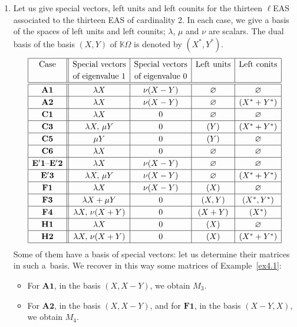 \documentclass[10pt,a4paper]{amsart}
\numberwithin{equation}{section}
\begin{document}
\begin{Example}\quad
\begin{enumerate}\itemsep=0pt
\item[(1)] Let us give special vectors, left units and left counits for the thirteen $\ell$EAS associated to the thirteen EAS of cardinality 2. In each case, we give a basis of the spaces of left units and left counits; $\lambda$, $\mu$ and $\nu$ are scalars.
The dual basis of the basis $(X,Y)$ of $\mathbb{K}\Omega$ is denoted by $(X^*,Y^*)$.
$$\renewcommand{\arraystretch}{1.2} \begin{array}{|c||c|c|c|c|}
\hline \text{Case}&\text{Special vectors}&\text{Special vectors}&\text{Left units}&\text{Left conits}\\
&\text{of eigenvalue 1}&\text{of eigenvalue 0}&&\\
\hline \hline \mathbf{A1}&\lambda X&\nu(X-Y)&\varnothing&\varnothing\\
\hline \mathbf{A2}&\lambda X&\nu(X-Y)&\varnothing&(X^*+Y^*)\\
\hline \mathbf{C1}&\lambda X&0&\varnothing&\varnothing\\
\hline \mathbf{C3}&\lambda X,\, \mu Y&0&(Y)&(X^*+Y^*)\\
\hline \mathbf{C5}&\mu Y&0&(Y)&\varnothing\\
\hline \mathbf{C6}&\lambda X&0&\varnothing&\varnothing\\
\hline \mathbf{E'1}\text{--}\mathbf{E'2}&\lambda X&\nu(X-Y)&\varnothing&\varnothing\\
\hline \mathbf{E'3}&\lambda X,\, \mu Y&\nu(X-Y)&\varnothing&(X^*+Y^*)\\
\hline \mathbf{F1}&\lambda X&\nu(X-Y)&(X)&\varnothing\\
\hline \mathbf{F3}&\lambda X+\mu Y&0&(X,Y)&(X^*,Y^*)\\
\hline \mathbf{F4}&\lambda X,\, \nu(X+Y)&0&(X+Y)&(X^*)\\
\hline \mathbf{H1}&\lambda X&0&(X)&\varnothing\\
\hline \mathbf{H2}&\lambda X,\, \nu(X+Y)&0&(X)&(X^*+Y^*)\\
\hline \end{array}$$
Some of them have a basis of special vectors: let us determine their matrices in such a~basis. We recover in this way some matrices of Example~\ref{ex4.1}:
\begin{itemize}\itemsep=0pt
\item For $\mathbf{A1}$, in the basis $(X,X-Y)$, we obtain $M_3$.
\item For $\mathbf{A2}$, in the basis $(X,X-Y)$, and for $\mathbf{F1}$, in the basis $(X-Y,X)$, we obtain $M_4$.

\end{itemize}
\end{enumerate}
\end{Example}
\end{document}
